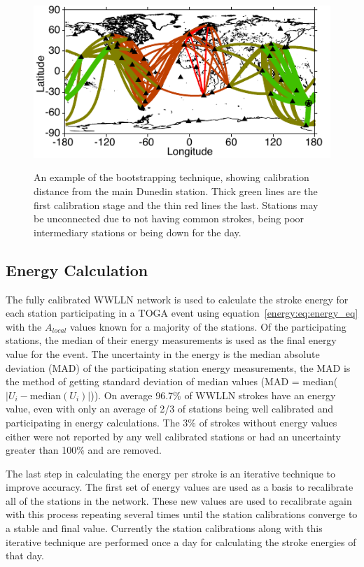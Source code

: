 \begin{figure}[ht!]
\centering
\includegraphics[scale=1]{energy/Figures/PPS_Hop.pdf}\\
\caption{An example of the bootstrapping technique, showing calibration distance from the main Dunedin station. Thick green lines are the first calibration stage and the thin red lines the last. Stations may be unconnected due to not having common strokes, being poor intermediary stations or being down for the day.}
\label{energy:fig:bootstrap}
\end{figure}

\subsection{Energy Calculation}

The fully calibrated WWLLN network is used to calculate the stroke energy for each station participating in a TOGA event using equation~\ref{energy:eq:energy_eq} with the $A_{local}$ values known for a majority of the stations.
Of the participating stations, the median of their energy measurements is used as the final energy value for the event.
The uncertainty in the energy is the median absolute deviation (MAD) of the participating station energy measurements, the MAD is the method of getting standard deviation of median values (MAD = median($|U_i - $median$(U_i)|$)).
On average 96.7\% of WWLLN strokes have an energy value, even with only an average of 2/3 of stations being well calibrated and participating in energy calculations.
The 3\% of strokes without energy values either were not reported by any well calibrated stations or had an uncertainty greater than 100\% and are removed.

The last step in calculating the energy per stroke is an iterative technique to improve accuracy.
The first set of energy values are used as a basis to recalibrate all of the stations in the network.
These new values are used to recalibrate again with this process repeating several times until the station calibrations converge to a stable and final value.
Currently the station calibrations along with this iterative technique are performed once a day for calculating the stroke energies of that day.

